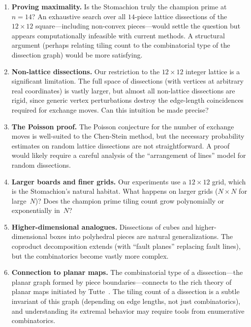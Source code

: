 \documentclass[12pt]{article}
\theoremstyle{definition}
\theoremstyle{remark}
\begin{document}
\begin{enumerate}[label=(\arabic*)]
\item \textbf{Proving maximality.}
  Is the Stomachion truly the champion prime at $n = 14$? An exhaustive
  search over all $14$-piece lattice dissections of the $12 \times 12$
  square---including non-convex pieces---would settle the question but
  appears computationally infeasible with current methods. A structural
  argument (perhaps relating tiling count to the combinatorial type of
  the dissection graph) would be more satisfying.

\item \textbf{Non-lattice dissections.}
  Our restriction to the $12 \times 12$ integer lattice is a significant
  limitation. The full space of dissections (with vertices at arbitrary
  real coordinates) is vastly larger, but almost all non-lattice
  dissections are rigid, since generic vertex perturbations destroy the
  edge-length coincidences required for exchange moves. Can this
  intuition be made precise?

\item \textbf{The Poisson proof.}
  The Poisson conjecture for the number of exchange moves is well-suited
  to the Chen-Stein method, but the necessary probability estimates on
  random lattice dissections are not straightforward. A proof would
  likely require a careful analysis of the ``arrangement of lines'' model
  for random dissections.

\item \textbf{Larger boards and finer grids.}
  Our experiments use a $12 \times 12$ grid, which is the Stomachion's
  natural habitat. What happens on larger grids ($N \times N$ for large~$N$)?
  Does the champion prime tiling count grow polynomially or
  exponentially in~$N$?

\item \textbf{Higher-dimensional analogues.}
  Dissections of cubes and higher-dimensional boxes into polyhedral
  pieces are natural generalizations. The coproduct decomposition
  extends (with ``fault planes'' replacing fault lines), but the
  combinatorics become vastly more complex.

\item \textbf{Connection to planar maps.}
  The combinatorial type of a dissection---the planar graph formed by
  piece boundaries---connects to the rich theory of planar maps
  initiated by Tutte~\cite{Tutte1963}. The tiling count of a dissection
  is a subtle invariant of this graph (depending on edge lengths, not
  just combinatorics), and understanding its extremal behavior may
  require tools from enumerative combinatorics.
\end{enumerate}
\end{document}
